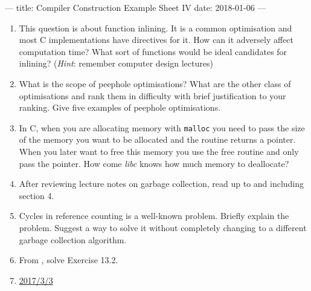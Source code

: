 ---
title: Compiler Construction Example Sheet IV
date: 2018-01-06
---



\begin{enumerate}
  \item This question is about function inlining. It is a common optimisation
    and most \textsc{C} implementations have directives for it. How can it
    adversely affect computation time? What sort of functions would be ideal
    candidates for inlining? (\emph{Hint}: remember computer design lectures)

  \item What is the scope of peephole optimisations? What are the other class
    of optimisations and rank them in difficulty with brief justification to
    your ranking. Give five examples of peephole optimisations.

  \item In \textsc{C}, when you are allocating memory with \texttt{malloc} you
    need to pass the size of the memory you want to be allocated and the
    routine returns a pointer. When you later want to free this memory you use
    the free routine and only pass the pointer. How come \emph{libc} knows how
    much memory to deallocate?

  \item After reviewing lecture notes on garbage collection, read
    \citet{unified} up to and including section 4.

  \item Cycles in reference counting is a well-known problem. Briefly explain
    the problem. Suggest a way to solve it without completely changing to a
    different garbage collection algorithm.

  \item From \citet[chap. 13]{mogensen}, solve Exercise 13.2.

  \item \href{http://www.cl.cam.ac.uk/teaching/exams/pastpapers/y2017p23q3.pdf}{2017/3/3}

\end{enumerate}


